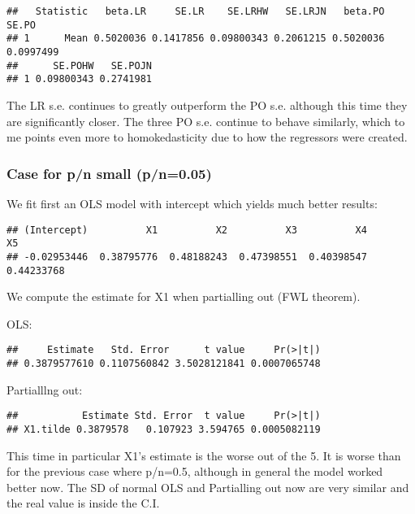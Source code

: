 \documentclass[
]{article}
\begin{document}
\begin{verbatim}
##   Statistic   beta.LR     SE.LR    SE.LRHW   SE.LRJN   beta.PO     SE.PO
## 1      Mean 0.5020036 0.1417856 0.09800343 0.2061215 0.5020036 0.0997499
##      SE.POHW   SE.POJN
## 1 0.09800343 0.2741981
\end{verbatim}

The LR s.e. continues to greatly outperform the PO s.e. although this
time they are significantly closer. The three PO s.e. continue to behave
similarly, which to me points even more to homokedasticity due to how
the regressors were created.

\subsubsection{Case for p/n small
(p/n=0.05)}\label{case-for-pn-small-pn0.05}

We fit first an OLS model with intercept which yields much better
results:

\begin{verbatim}
## (Intercept)          X1          X2          X3          X4          X5 
## -0.02953446  0.38795776  0.48188243  0.47398551  0.40398547  0.44233768
\end{verbatim}

We compute the estimate for X1 when partialling out (FWL theorem).

OLS:

\begin{verbatim}
##     Estimate   Std. Error      t value     Pr(>|t|) 
## 0.3879577610 0.1107560842 3.5028121841 0.0007065748
\end{verbatim}

Partialllng out:

\begin{verbatim}
##           Estimate Std. Error  t value     Pr(>|t|)
## X1.tilde 0.3879578   0.107923 3.594765 0.0005082119
\end{verbatim}

This time in particular X1's estimate is the worse out of the 5. It is
worse than for the previous case where p/n=0.5, although in general the
model worked better now. The SD of normal OLS and Partialling out now
are very similar and the real value is inside the C.I.
\end{document}
